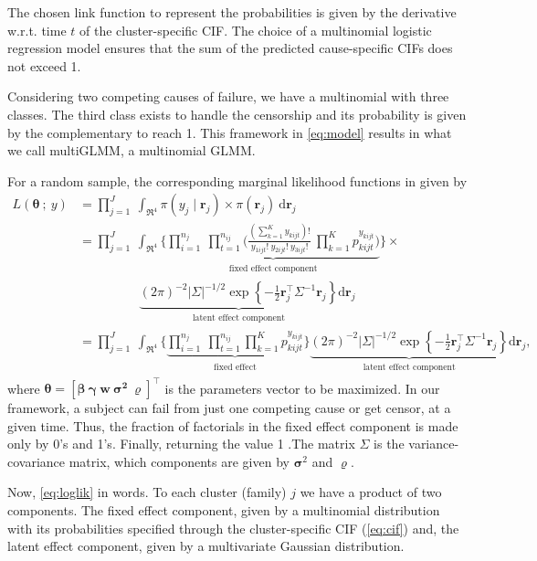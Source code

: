 The chosen link function to represent the probabilities is given by the
derivative w.r.t. time \(t\) of the cluster-specific CIF. The choice of
a multinomial logistic regression model ensures that the sum of the
predicted cause-specific CIFs does not exceed 1.

Considering two competing causes of failure, we have a multinomial with
three classes. The third class exists to handle the censorship and its
probability is given by the complementary to reach 1. This framework in
\autoref{eq:model} results in what we call multiGLMM, a multinomial
GLMM.

For a random sample, the corresponding marginal likelihood functions in
given by
\begin{align}
  L(\bm{\theta}~;~y)
  &= \prod_{j=1}^{J}~\int_{\Re^{4}}
    \pi(y_{j} \mid \bm{r}_{j})\times\pi(\bm{r}_{j})~\text{d}\bm{r}_{j}
    \nonumber\\
  &= \prod_{j=1}^{J}~\int_{\Re^{4}}
    \Bigg\{
    \underbrace{\prod_{i=1}^{n_{j}}~\prod_{t=1}^{n_{ij}}
    \Bigg(
    \frac{(\sum_{k=1}^{K}y_{kijt})!}{y_{1ijt}!~y_{2ijt}!~y_{3ijt}!}~
    \prod_{k=1}^{K} p_{kijt}^{y_{kijt}}
    \Bigg)}_{\substack{\text{fixed effect component}}}
  \Bigg\}\times\nonumber\\
  &\hspace{2cm}\underbrace{
    (2\pi)^{-2} |\Sigma|^{-1/2} \exp
    \left\{-\frac{1}{2}\bm{r}_{j}^{\top} \Sigma^{-1} \bm{r}_{j}\right\}
    }_{\substack{\text{latent effect component}}}
    \text{d}\bm{r}_{j}\nonumber\\
  &= \prod_{j=1}^{J}~\int_{\Re^{4}}
    \Bigg\{
    \underbrace{\prod_{i=1}^{n_{j}}~\prod_{t=1}^{n_{ij}}
    \prod_{k=1}^{K} p_{kijt}^{y_{kijt}}
    }_{\substack{\text{fixed effect}}}
  \Bigg\}\underbrace{
  (2\pi)^{-2} |\Sigma|^{-1/2} \exp
  \left\{-\frac{1}{2}\bm{r}_{j}^{\top} \Sigma^{-1} \bm{r}_{j}\right\}
  }_{\substack{\text{latent effect component}}}
  \text{d}\bm{r}_{j}\label{eq:loglik},
\end{align}
where \(\bm{\theta} = [\bm{\beta}~\bm{\gamma}~\bm{w}~\bm{\sigma^{2}}~
\bm{\varrho}]^{\top}\) is the parameters vector to be maximized. In our
framework, a subject can fail from just one competing cause or get
censor, at a given time. Thus, the fraction of factorials in the fixed
effect component is made only by 0's and 1's. Finally, returning the
value 1 .The matrix \(\Sigma\) is the variance-covariance matrix, which
components are given by \(\bm{\sigma}^{2}\) and \(\bm{\varrho}\).

Now, \autoref{eq:loglik} in words. To each cluster (family) \(j\) we
have a product of two components. The fixed effect component, given by a
multinomial distribution with its probabilities specified through the
cluster-specific CIF (\autoref{eq:cif}) and, the latent effect
component, given by a multivariate Gaussian distribution.

